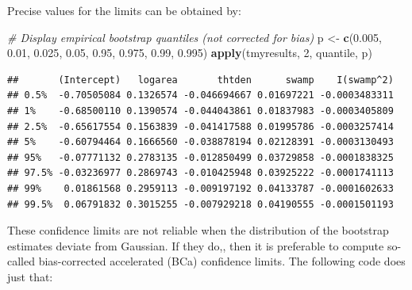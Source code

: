 \documentclass[
  12pt,
]{book}
\newenvironment{Shaded}{\begin{snugshade}}{\end{snugshade}}
\newcommand{\CommentTok}[1]{\textcolor[rgb]{0.56,0.35,0.01}{\textit{#1}}}
\newcommand{\DecValTok}[1]{\textcolor[rgb]{0.00,0.00,0.81}{#1}}
\newcommand{\FloatTok}[1]{\textcolor[rgb]{0.00,0.00,0.81}{#1}}
\newcommand{\KeywordTok}[1]{\textcolor[rgb]{0.13,0.29,0.53}{\textbf{#1}}}
\newcommand{\NormalTok}[1]{#1}
\newcommand{\StringTok}[1]{\textcolor[rgb]{0.31,0.60,0.02}{#1}}
\begin{document}
Precise values for the limits can be obtained by:

\begin{Shaded}
\begin{Highlighting}[]
\CommentTok{\# Display empirical bootstrap quantiles (not corrected for bias)}
\NormalTok{p \textless{}{-}}\StringTok{ }\KeywordTok{c}\NormalTok{(}\FloatTok{0.005}\NormalTok{, }\FloatTok{0.01}\NormalTok{, }\FloatTok{0.025}\NormalTok{, }\FloatTok{0.05}\NormalTok{, }\FloatTok{0.95}\NormalTok{, }\FloatTok{0.975}\NormalTok{, }\FloatTok{0.99}\NormalTok{, }\FloatTok{0.995}\NormalTok{)}
\KeywordTok{apply}\NormalTok{(tmyresults, }\DecValTok{2}\NormalTok{, quantile, p)}
\end{Highlighting}
\end{Shaded}

\begin{verbatim}
##       (Intercept)   logarea       thtden      swamp    I(swamp^2)
## 0.5%  -0.70505084 0.1326574 -0.046694667 0.01697221 -0.0003483311
## 1%    -0.68500110 0.1390574 -0.044043861 0.01837983 -0.0003405809
## 2.5%  -0.65617554 0.1563839 -0.041417588 0.01995786 -0.0003257414
## 5%    -0.60794464 0.1666560 -0.038878194 0.02128391 -0.0003130493
## 95%   -0.07771132 0.2783135 -0.012850499 0.03729858 -0.0001838325
## 97.5% -0.03236977 0.2869743 -0.010425948 0.03925222 -0.0001741113
## 99%    0.01861568 0.2959113 -0.009197192 0.04133787 -0.0001602633
## 99.5%  0.06791832 0.3015255 -0.007929218 0.04190555 -0.0001501193
\end{verbatim}

These confidence limits are not reliable when the distribution of the bootstrap estimates deviate from Gaussian. If they do,, then it is preferable to compute so-called bias-corrected accelerated (BCa) confidence limits. The following code does just that:
\end{document}
